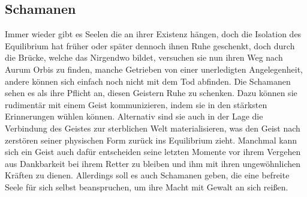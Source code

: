 \documentclass[a4paper,12pt,oneside]{book}
\begin{document}
\subsection{Schamanen}
Immer wieder gibt es Seelen die an ihrer Existenz hängen, doch die Isolation des Equilibrium hat früher oder später dennoch ihnen Ruhe geschenkt, doch durch die Brücke, welche das Nirgendwo bildet, versuchen sie nun ihren Weg nach Aurum Orbis zu finden, manche Getrieben von einer unerledigten Angelegenheit, andere können sich einfach noch nicht mit dem Tod abfinden. Die Schamanen sehen es als ihre Pflicht an, diesen Geistern Ruhe zu schenken. Dazu können sie rudimentär mit einem Geist kommunizieren, indem sie in den stärksten Erinnerungen wühlen können. Alternativ sind sie auch in der Lage die Verbindung des Geistes zur sterblichen Welt materialisieren, was den Geist nach zerstören seiner physischen Form zurück ins Equilibrium zieht. Manchmal kann sich ein Geist auch dafür entscheiden seine letzten Momente vor ihrem Vergehen aus Dankbarkeit bei ihrem Retter zu bleiben und ihm mit ihren ungewöhnlichen Kräften zu dienen. Allerdings soll es auch Schamanen geben, die eine befreite Seele für sich selbst beanspruchen, um ihre Macht mit Gewalt an sich reißen. 
\end{document}
